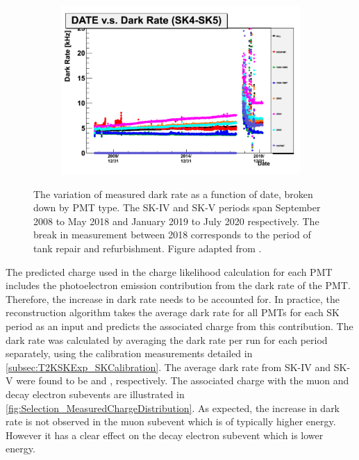 \begin{figure}[h]
  \begin{subfigure}[t]{\textwidth}
    \includegraphics[width=\textwidth, trim={0mm 0mm 0mm 0mm}, clip, page=1]{Figures/Selections/DarkRate.pdf}
  \end{subfigure}
  \caption{The variation of measured dark rate as a function of date, broken down by PMT type. The SK-IV and SK-V periods span September 2008 to May 2018 and January 2019 to July 2020 respectively. The break in measurement between 2018 corresponds to the period of tank repair and refurbishment. Figure adapted from \cite{t2k_tn_326}.}
  \label{fig:Selection_DarkRateVariation}
\end{figure}

The predicted charge used in the \fq charge likelihood calculation for each PMT includes the photoelectron emission contribution from the dark rate of the PMT. Therefore, the increase in dark rate needs to be accounted for. In practice, the reconstruction algorithm takes the average dark rate for all PMTs for each SK period as an input and predicts the associated charge from this contribution. The dark rate was calculated by averaging the dark rate per run for each period separately, using the calibration measurements detailed in \autoref{subsec:T2KSKExp_SKCalibration}. The average dark rate from SK-IV and SK-V were found to be  and , respectively. The associated charge with the muon and decay electron subevents are illustrated in \autoref{fig:Selection_MeasuredChargeDistribution}. As expected, the increase in dark rate is not observed in the muon subevent which is of typically higher energy. However it has a clear effect on the decay electron subevent which is lower energy.

